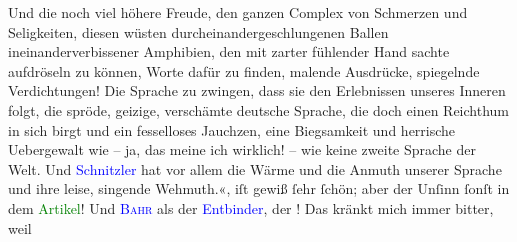 {{{                     Und die noch viel höhere Freude, den ganzen Complex von Schmerzen und
                     Seligkeiten, diesen wüsten durcheinandergeschlungenen Ballen
                     ineinanderverbissener Amphibien, den mit zarter fühlender Hand sachte
                     aufdröseln zu können, Worte dafür zu finden, malende Ausdrücke, spiegelnde
                     Verdichtungen! Die Sprache zu zwingen, dass sie den Erlebnissen unseres Inneren
                     folgt, die spröde, geizige, verschämte deutsche Sprache, die doch einen
                     Reichthum in sich birgt und ein fesselloses Jauchzen, eine Biegsamkeit und
                     herrische Uebergewalt wie – ja, das meine ich wirklich! – wie keine zweite
                     Sprache der Welt. Und \textcolor{blue}{Schnitzler} hat vor
                     allem die Wärme und die Anmuth unserer Sprache und ihre leise, singende
                     Wehmuth.«}}}\label{K_L02792-24h}, iſt {\pb}gewiß ſehr
               ſchön; aber der Unſinn ſonſt in dem \textcolor{green}{Artikel}{}! Und \textsc{\textcolor{blue}{Bahr}{}\ledrightnote{\textcolor{blue}{Hermann Bahr}}} als der \textcolor{blue}{Entbinder}{}, der
                  \label{K_L02792-87v}\label{K_L02792-87h}! Das kränkt mich immer bitter, weil
